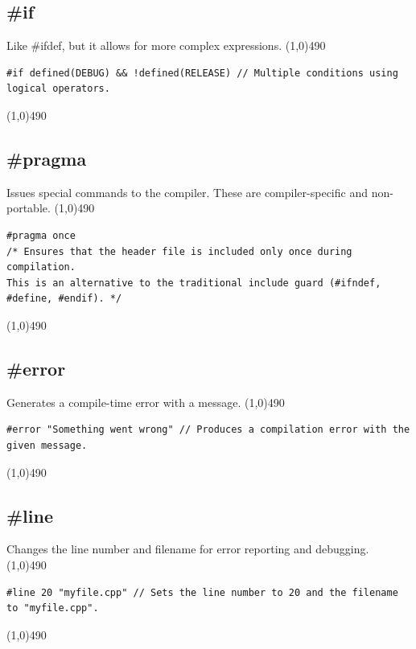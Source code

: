 \documentclass{report}
\begin{document}
    \bigbreak \noindent 
    \subsection{\#if}
    \bigbreak \noindent 
    Like \#ifdef, but it allows for more complex expressions.
    \bigbreak \noindent 
    \line(1,0){490}
    \begin{verbatim}
#if defined(DEBUG) && !defined(RELEASE) // Multiple conditions using logical operators.
    \end{verbatim}
    \line(1,0){490}

    \bigbreak \noindent 
    \subsection{\#pragma}
    \bigbreak \noindent 
    Issues special commands to the compiler. These are compiler-specific and non-portable.
    \bigbreak \noindent 
    \line(1,0){490}
    \begin{verbatim}
#pragma once 
/* Ensures that the header file is included only once during compilation. 
This is an alternative to the traditional include guard (#ifndef, #define, #endif). */
    \end{verbatim}
    \line(1,0){490}

    \bigbreak \noindent 
    \subsection{\#error}
    \bigbreak \noindent 
    Generates a compile-time error with a message.
    \bigbreak \noindent 
    \line(1,0){490}
    \begin{verbatim}
#error "Something went wrong" // Produces a compilation error with the given message.
    \end{verbatim}
    \line(1,0){490}

    \bigbreak \noindent 
    \subsection{\#line}
    \bigbreak \noindent 
    Changes the line number and filename for error reporting and debugging.
    \bigbreak \noindent 
    \line(1,0){490}
    \begin{verbatim}
#line 20 "myfile.cpp" // Sets the line number to 20 and the filename to "myfile.cpp".
    \end{verbatim}
    \line(1,0){490}

    \pagebreak \bigbreak \noindent 
\end{document}
